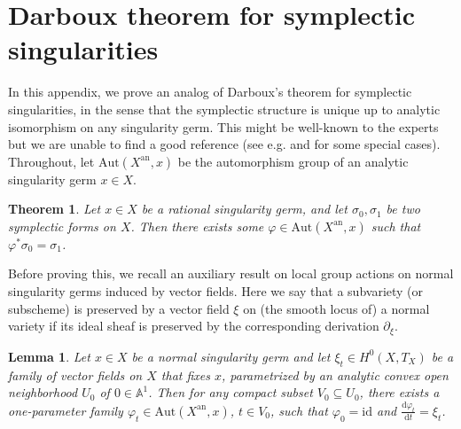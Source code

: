 \documentclass[12pt]{amsart}
\newtheorem{thm}[prop]{Theorem}
\newtheorem{lem}[prop]{Lemma}
\theoremstyle{definition}
\newcommand{\bA}{\mathbb{A}}
\newcommand{\rd}{\mathrm{d}}
\newcommand{\Aut}{\mathrm{Aut}}
\newcommand{\an}{\mathrm{an}}
\numberwithin{equation}{section}
\begin{document}
\appendix

\section{Darboux theorem for symplectic singularities} \label{s:Darboux}

In this appendix, we prove an analog of Darboux's theorem for symplectic singularities, in the sense that the symplectic structure is unique up to analytic isomorphism on any singularity germ. This might be well-known to the experts but we are unable to find a good reference (see e.g. \cite[Lemma 1.3]{Namikawa-deformation} and \cite{Namikawa-equivalence-symp} for some special cases). Throughout, let $\Aut(X^{\an},x)$ be the automorphism group of an analytic singularity germ $x\in X$.

\begin{thm} \label{thm:Darboux}
Let $x\in X$ be a rational singularity germ, and let $\sigma_0,\sigma_1$ be two symplectic forms on $X$. Then there exists some $\varphi\in \Aut(X^\an,x)$ such that $\varphi^*\sigma_0 = \sigma_1$.
\end{thm}

Before proving this, we recall an auxiliary result on local group actions on normal singularity germs induced by vector fields. Here we say that a subvariety (or subscheme) is preserved by a vector field $\xi$ on (the smooth locus of) a normal variety if its ideal sheaf is preserved by the corresponding derivation $\partial_\xi$.

\begin{lem} \label{lem:vector field->auto}
Let $x\in X$ be a normal singularity germ and let $\xi_t\in H^0(X,T_X)$ be a family of vector fields on $X$ that fixes $x$, parametrized by an analytic convex open neighborhood $U_0$ of $0\in\bA^1$. Then for any compact subset $V_0\subseteq U_0$, there exists a one-parameter family $\varphi_t\in \Aut(X^{\an},x)$, $t\in V_0$, such that $\varphi_0=\mathrm{id}$ and $\frac{\rd \varphi_t}{\rd t} = \xi_t$.
\end{lem}
\end{document}
